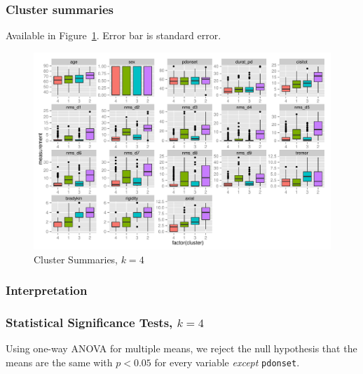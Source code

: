\documentclass[letterpaper,12pt]{article}
\begin{document}
\subsubsection{Cluster summaries}

Available in Figure~\ref{fig:kmeans-summaries-4}. Error bar is standard error.

\begin{figure}[h]
  \centering
  \includegraphics[width=\linewidth]{kmeans-summaries-4.pdf}
  \caption{Cluster Summaries, $k = 4$}
  \label{fig:kmeans-summaries-4}
\end{figure}

\subsubsection{Interpretation}

\subsubsection{Statistical Significance Tests, $k = 4$}
Using one-way ANOVA for multiple means, we reject the null
hypothesis that the means are the same with $p < 0.05$ for every variable
\emph{except} \texttt{pdonset}.
\end{document}
